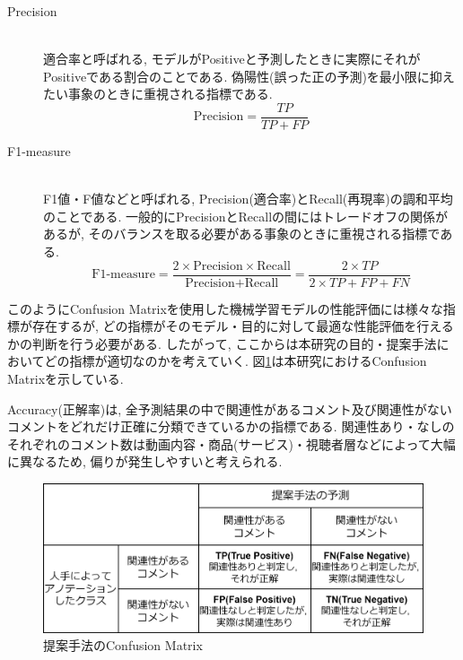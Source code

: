 \documentclass{ltjarticle}
\begin{document}
\begin{description}
    \item[Precision]\mbox{}\\
    適合率と呼ばれる, モデルがPositiveと予測したときに実際にそれがPositiveである割合のことである. 
    偽陽性(誤った正の予測)を最小限に抑えたい事象のときに重視される指標である. \\
    \begin{equation}
        \textrm{Precision} = \dfrac{TP}{TP+FP}
        \label{equation:Precision}
    \end{equation}
    \vspace{5truept}

    \item[F1-measure]\mbox{}\\
    F1値・F値などと呼ばれる, Precision(適合率)とRecall(再現率)の調和平均のことである. 
    一般的にPrecisionとRecallの間にはトレードオフの関係があるが, そのバランスを取る必要がある事象のときに重視される指標である. \\
    \begin{equation}
        \textrm{F1-measure} = \dfrac{2\times \textrm{Precision}\times \textrm{Recall}}{\textrm{Precision}+\textrm{Recall}} = \dfrac{2\times TP}{2\times TP+FP+FN}
        \label{equation:F1}
    \end{equation}
    \vspace{5truept}

\end{description}

このようにConfusion Matrixを使用した機械学習モデルの性能評価には様々な指標が存在するが, 
どの指標がそのモデル・目的に対して最適な性能評価を行えるかの判断を行う必要がある. 
したがって, ここからは本研究の目的・提案手法においてどの指標が適切なのかを考えていく. 
図\ref{fig:提案手法のconfusion}は本研究におけるConfusion Matrixを示している. 

Accuracy(正解率)は, 全予測結果の中で関連性があるコメント及び関連性がないコメントをどれだけ正確に分類できているかの指標である. 
関連性あり・なしのそれぞれのコメント数は動画内容・商品(サービス)・視聴者層などによって大幅に異なるため, 
偏りが発生しやすいと考えられる. 
\vspace{3truept}

\begin{figure}[ht]
    \centering
    \includegraphics[width = 12cm]{images/提案手法のconfusion.drawio.png}
    \caption{提案手法のConfusion Matrix}
    \label{fig:提案手法のconfusion}
\end{figure}
\vspace{5truept}
\end{document}
